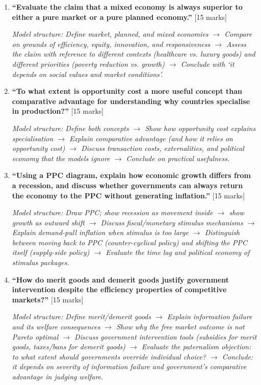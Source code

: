 \documentclass[11pt, a4paper, twoside]{book}
\begin{document}
\begin{exampractice}
\begin{enumerate}[leftmargin=*]

\item \textbf{``Evaluate the claim that a mixed economy is always superior to either a pure market or a pure planned economy.''} [15 marks]

\textit{Model structure: Define market, planned, and mixed economies $\to$ Compare on grounds of efficiency, equity, innovation, and responsiveness $\to$ Assess the claim with reference to different contexts (healthcare vs. luxury goods) and different priorities (poverty reduction vs. growth) $\to$ Conclude with `it depends on social values and market conditions'.}

\item \textbf{``To what extent is opportunity cost a more useful concept than comparative advantage for understanding why countries specialise in production?''} [15 marks]

\textit{Model structure: Define both concepts $\to$ Show how opportunity cost explains specialisation $\to$ Explain comparative advantage (and how it relies on opportunity cost) $\to$ Discuss transaction costs, externalities, and political economy that the models ignore $\to$ Conclude on practical usefulness.}

\item \textbf{``Using a PPC diagram, explain how economic growth differs from a recession, and discuss whether governments can always return the economy to the PPC without generating inflation.''} [15 marks]

\textit{Model structure: Draw PPC; show recession as movement inside $\to$ show growth as outward shift $\to$ Discuss fiscal/monetary stimulus mechanisms $\to$ Explain demand-pull inflation when stimulus is too large $\to$ Distinguish between moving back to PPC (counter-cyclical policy) and shifting the PPC itself (supply-side policy) $\to$ Evaluate the time lag and political economy of stimulus packages.}

\item \textbf{``How do merit goods and demerit goods justify government intervention despite the efficiency properties of competitive markets?''} [15 marks]

\textit{Model structure: Define merit/demerit goods $\to$ Explain information failure and its welfare consequences $\to$ Show why the free market outcome is not Pareto optimal $\to$ Discuss government intervention tools (subsidies for merit goods, taxes/bans for demerit goods) $\to$ Evaluate the paternalism objection: to what extent should governments override individual choice? $\to$ Conclude: it depends on severity of information failure and government's comparative advantage in judging welfare.}

\end{enumerate}
\end{exampractice}
\end{document}
